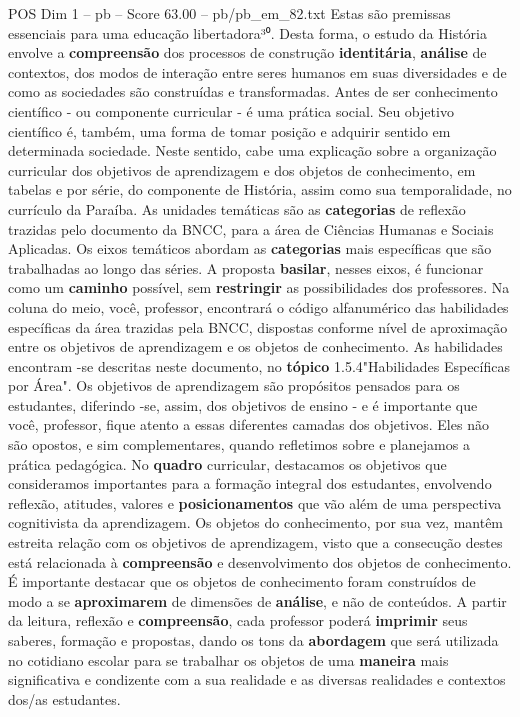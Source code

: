 \begin{textsample}{POS Dim 1 – pb – Score 63.00 – pb/pb\_em\_82.txt}
Estas são premissas essenciais para uma educação libertadora³⁰.
Desta forma, o estudo da História envolve a \textbf{compreensão} dos processos de construção \textbf{identitária}, \textbf{análise} de contextos, dos modos de interação entre seres humanos em suas diversidades e de como as sociedades são construídas e transformadas.
Antes de ser conhecimento científico - ou componente curricular - é uma prática social.
Seu objetivo científico é, também, uma forma de tomar posição e adquirir sentido em determinada sociedade.
Neste sentido, cabe uma explicação sobre a organização curricular dos objetivos de aprendizagem e dos objetos de conhecimento, em tabelas e por série, do componente de História, assim como sua temporalidade, no currículo da Paraíba.
As unidades temáticas são as \textbf{categorias} de reflexão trazidas pelo documento da BNCC, para a área de Ciências Humanas e Sociais Aplicadas.
Os eixos temáticos abordam as \textbf{categorias} mais específicas que são trabalhadas ao longo das séries.
A proposta \textbf{basilar}, nesses eixos, é funcionar como um \textbf{caminho} possível, sem \textbf{restringir} as possibilidades dos professores.
Na coluna do meio, você, professor, encontrará o código alfanumérico das habilidades específicas da área trazidas pela BNCC, dispostas conforme nível de aproximação entre os objetivos de aprendizagem e os objetos de conhecimento.
As habilidades encontram -se descritas neste documento, no \textbf{tópico} 1.5.4"Habilidades Específicas por Área".
Os objetivos de aprendizagem são propósitos pensados para os estudantes, diferindo -se, assim, dos objetivos de ensino - e é importante que você, professor, fique atento a essas diferentes camadas dos objetivos.
Eles não são opostos, e sim complementares, quando refletimos sobre e planejamos a prática pedagógica.
No \textbf{quadro} curricular, destacamos os objetivos que consideramos importantes para a formação integral dos estudantes, envolvendo reflexão, atitudes, valores e \textbf{posicionamentos} que vão além de uma perspectiva cognitivista da aprendizagem.
Os objetos do conhecimento, por sua vez, mantêm estreita relação com os objetivos de aprendizagem, visto que a consecução destes está relacionada à \textbf{compreensão} e desenvolvimento dos objetos de conhecimento.
É importante destacar que os objetos de conhecimento foram construídos de modo a se \textbf{aproximarem} de dimensões de \textbf{análise}, e não de conteúdos.
A partir da leitura, reflexão e \textbf{compreensão}, cada professor poderá \textbf{imprimir} seus saberes, formação e propostas, dando os tons da \textbf{abordagem} que será utilizada no cotidiano escolar para se trabalhar os objetos de uma \textbf{maneira} mais significativa e condizente com a sua realidade e as diversas realidades e contextos dos/as estudantes.

\end{textsample}
